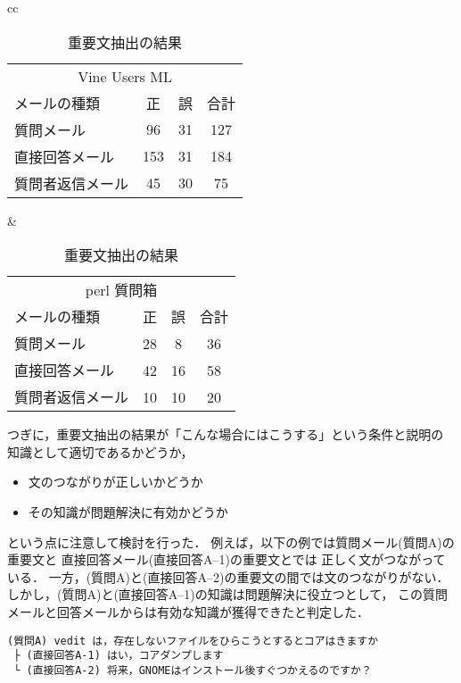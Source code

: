 \begin{table}[tbp]
  \leavevmode
  \begin{center}
    \vspace{-3mm}

   \caption{重要文抽出の結果}
   \label{tab:重要文抽出の結果}

   \vspace{2mm}

\begin{tabular}[t]{cc}
   \begin{tabular}{lcc|c} 
    \multicolumn{4}{c}{Vine Users ML} \\
    メールの種類     &        正 &         誤 &  合計  \\ \hline
    質問メール       &        96 &         31 &   127  \\ 
    直接回答メール   &       153 &         31 &   184  \\
    質問者返信メール &        45 &         30 &    75  \\
   \end{tabular}
 & 
   \begin{tabular}{lcc|c} 
    \multicolumn{4}{c}{perl 質問箱} \\
    メールの種類     &        正 &         誤 &  合計  \\ \hline
    質問メール       &        28 &          8 &   36  \\ 
    直接回答メール   &        42 &         16 &   58  \\
    質問者返信メール &        10 &         10 &   20  \\
   \end{tabular}
\end{tabular}


  \end{center}
\end{table}



   つぎに，重要文抽出の結果が「こんな場合にはこうする」という条件と説明の
   知識として適切であるかどうか，
    \begin{itemize}
     \item 文のつながりが正しいかどうか
     \item その知識が問題解決に有効かどうか
    \end{itemize} 
    という点に注意して検討を行った．
    例えば，以下の例では質問メール(質問A)の重要文と
    直接回答メール(直接回答A--1)の重要文とでは
    正しく文がつながっている．
    一方，(質問A)と(直接回答A--2)の重要文の間では文のつながりがない．
    しかし，(質問A)と(直接回答A--1)の知識は問題解決に役立つとして，
    この質問メールと回答メールからは有効な知識が獲得できたと判定した．
\begin{verbatim}
(質問A) vedit は，存在しないファイルをひらこうとするとコアはきますか
 ├ (直接回答A-1) はい，コアダンプします
 └ (直接回答A-2) 将来，GNOMEはインストール後すぐつかえるのですか？
\end{verbatim}


